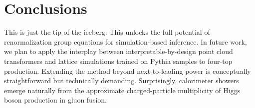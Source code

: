 \section{Conclusions}\label{sec:conclusions}

This is just the tip of the iceberg. This unlocks the full potential of
renormalization group equations for simulation-based inference. In
future work, we plan to apply the interplay between
interpretable-by-design point cloud transformers and lattice simulations
trained on Pythia samples to four-top production. Extending the method
beyond next-to-leading power is conceptually straightforward but
technically demanding. Surprisingly, calorimeter showers emerge
naturally from the approximate charged-particle multiplicity of Higgs
boson production in gluon fusion.

